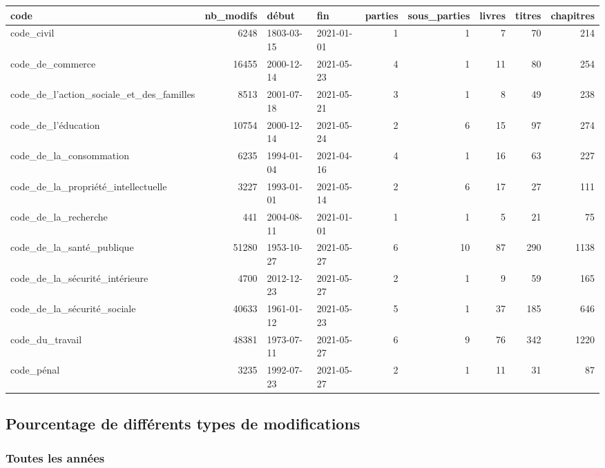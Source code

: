 \documentclass[
  oneside]{book}
\begin{document}
\begin{tabular}{l|r|l|l|r|r|r|r|r}
\hline
code & nb\_modifs & début & fin & parties & sous\_parties & livres & titres & chapitres\\
\hline
code\_civil & 6248 & 1803-03-15 & 2021-01-01 & 1 & 1 & 7 & 70 & 214\\
\hline
code\_de\_commerce & 16455 & 2000-12-14 & 2021-05-23 & 4 & 1 & 11 & 80 & 254\\
\hline
code\_de\_l'action\_sociale\_et\_des\_familles & 8513 & 2001-07-18 & 2021-05-21 & 3 & 1 & 8 & 49 & 238\\
\hline
code\_de\_l'éducation & 10754 & 2000-12-14 & 2021-05-24 & 2 & 6 & 15 & 97 & 274\\
\hline
code\_de\_la\_consommation & 6235 & 1994-01-04 & 2021-04-16 & 4 & 1 & 16 & 63 & 227\\
\hline
code\_de\_la\_propriété\_intellectuelle & 3227 & 1993-01-01 & 2021-05-14 & 2 & 6 & 17 & 27 & 111\\
\hline
code\_de\_la\_recherche & 441 & 2004-08-11 & 2021-01-01 & 1 & 1 & 5 & 21 & 75\\
\hline
code\_de\_la\_santé\_publique & 51280 & 1953-10-27 & 2021-05-27 & 6 & 10 & 87 & 290 & 1138\\
\hline
code\_de\_la\_sécurité\_intérieure & 4700 & 2012-12-23 & 2021-05-27 & 2 & 1 & 9 & 59 & 165\\
\hline
code\_de\_la\_sécurité\_sociale & 40633 & 1961-01-12 & 2021-05-23 & 5 & 1 & 37 & 185 & 646\\
\hline
code\_du\_travail & 48381 & 1973-07-11 & 2021-05-27 & 6 & 9 & 76 & 342 & 1220\\
\hline
code\_pénal & 3235 & 1992-07-23 & 2021-05-27 & 2 & 1 & 11 & 31 & 87\\
\hline
\end{tabular}

\hypertarget{pourcentage-de-diffuxe9rents-types-de-modifications}{%
\subsection{Pourcentage de différents types de modifications}\label{pourcentage-de-diffuxe9rents-types-de-modifications}}

\hypertarget{toutes-les-annuxe9es}{%
\subsubsection{Toutes les années}\label{toutes-les-annuxe9es}}
\end{document}
